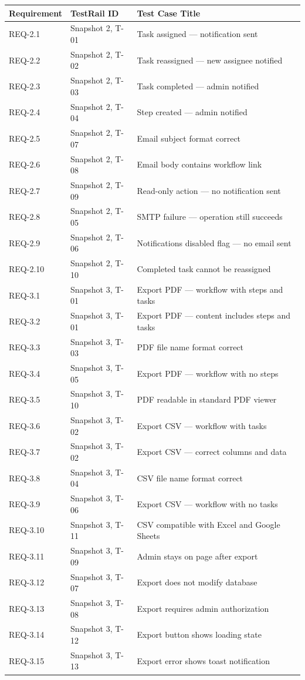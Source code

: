 \documentclass[12pt]{article}
\begin{document}
\begin{center}
\begin{longtable}{lll}
\toprule
Requirement & TestRail ID & Test Case Title \\
\midrule
REQ-2.1  & Snapshot 2, T-01 & Task assigned --- notification sent \\
REQ-2.2  & Snapshot 2, T-02 & Task reassigned --- new assignee notified \\
REQ-2.3  & Snapshot 2, T-03 & Task completed --- admin notified \\
REQ-2.4  & Snapshot 2, T-04 & Step created --- admin notified \\
REQ-2.5  & Snapshot 2, T-07 & Email subject format correct \\
REQ-2.6  & Snapshot 2, T-08 & Email body contains workflow link \\
REQ-2.7  & Snapshot 2, T-09 & Read-only action --- no notification sent \\
REQ-2.8  & Snapshot 2, T-05 & SMTP failure --- operation still succeeds \\
REQ-2.9  & Snapshot 2, T-06 & Notifications disabled flag --- no email sent \\
REQ-2.10 & Snapshot 2, T-10 & Completed task cannot be reassigned \\
REQ-3.1  & Snapshot 3, T-01 & Export PDF --- workflow with steps and tasks \\
REQ-3.2  & Snapshot 3, T-01 & Export PDF --- content includes steps and tasks \\
REQ-3.3  & Snapshot 3, T-03 & PDF file name format correct \\
REQ-3.4  & Snapshot 3, T-05 & Export PDF --- workflow with no steps \\
REQ-3.5  & Snapshot 3, T-10 & PDF readable in standard PDF viewer \\
REQ-3.6  & Snapshot 3, T-02 & Export CSV --- workflow with tasks \\
REQ-3.7  & Snapshot 3, T-02 & Export CSV --- correct columns and data \\
REQ-3.8  & Snapshot 3, T-04 & CSV file name format correct \\
REQ-3.9  & Snapshot 3, T-06 & Export CSV --- workflow with no tasks \\
REQ-3.10 & Snapshot 3, T-11 & CSV compatible with Excel and Google Sheets \\
REQ-3.11 & Snapshot 3, T-09 & Admin stays on page after export \\
REQ-3.12 & Snapshot 3, T-07 & Export does not modify database \\
REQ-3.13 & Snapshot 3, T-08 & Export requires admin authorization \\
REQ-3.14 & Snapshot 3, T-12 & Export button shows loading state \\
REQ-3.15 & Snapshot 3, T-13 & Export error shows toast notification \\
\bottomrule
\end{longtable}
\end{center}
 
\end{document}
